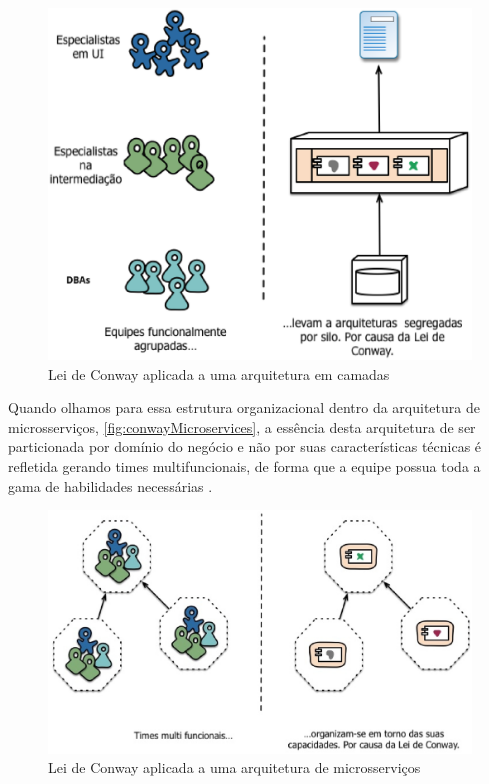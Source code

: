 \begin{figure}[h]
  \centering
  \includegraphics[keepaspectratio=true,scale=0.5]{figuras/conwayMonolithic-translated.eps}
  \caption{Lei de Conway aplicada a uma arquitetura em camadas\label{fig:conwayMonolithic} }
\end{figure}

Quando olhamos para essa estrutura organizacional dentro da arquitetura de microsserviços,
\autoref{fig:conwayMicroservices}, a essência desta arquitetura de ser particionada por domínio
do negócio e não por suas características técnicas é refletida gerando times multifuncionais, de
forma que a equipe possua toda a gama de habilidades necessárias \cite{MartinFowler:Microservices}.

\begin{figure}[h]
  \centering
  \includegraphics[keepaspectratio=true,scale=0.5]{figuras/conwayMicroservices-translated.eps}
  \caption{Lei de Conway aplicada a uma arquitetura de microsserviços\label{fig:conwayMicroservices} }
\end{figure}

